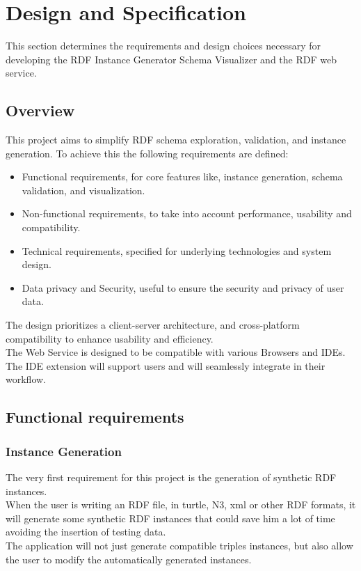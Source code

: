 \chapter{Design and Specification\label{cha:chapter3}}
This section determines the requirements and design choices necessary for developing the RDF Instance Generator Schema Visualizer and the RDF web service.

\section{Overview\label{sec:reqoverview}}

This project aims to simplify RDF schema exploration, validation, and instance generation. To achieve this the following requirements are defined: 
\begin{itemize}
    \item Functional requirements, for core features like, instance generation, schema validation, and visualization.
    \item Non-functional requirements, to take into account performance, usability and compatibility.
    \item Technical requirements, specified for underlying technologies and system design.
    \item Data privacy and Security, useful to ensure the security and privacy of user data.
\end{itemize}

The design prioritizes a client-server architecture, and cross-platform compatibility to enhance usability and efficiency. 
\\
The Web Service is designed to be compatible with various Browsers and IDEs. 
\\
The IDE extension will support users and will seamlessly integrate in their workflow.
\section{Functional requirements\label{sec:techreq}}
\subsection{Instance Generation\label{sec:reqsuba}}
The very first requirement for this project is the generation of synthetic RDF instances.
\\
When the user is writing an RDF file, in turtle, N3, xml or other RDF formats, it will generate some synthetic RDF instances that could save him a lot of time avoiding the insertion of testing data.
\\
The application will not just generate compatible triples instances, but also allow the user to modify the automatically generated instances.

